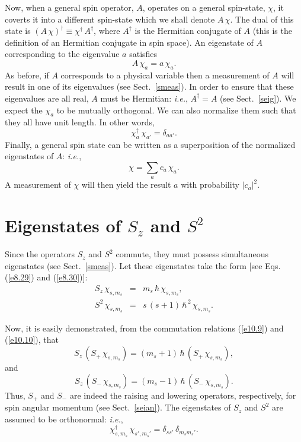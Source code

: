 Now, when a general spin operator, $A$, operates on a general spin-state, $\chi$, it coverts it into a different spin-state which we shall denote
$A\,\chi$. The dual of this state is $(A\,\chi)^\dag\equiv \chi^\dag\,A^\dag$, where $A^\dag$ is the Hermitian conjugate of $A$ (this is the definition of an
Hermitian conjugate in spin space).  An eigenstate
of $A$ corresponding to the eigenvalue $a$ satisfies
\begin{equation}
A\,\chi_{a} = a\,\chi_{a}.
\end{equation}
As before, if $A$ corresponds to a physical variable then a measurement
of $A$ will result in one of its eigenvalues (see Sect.~\ref{smeas}). In order to ensure that
these eigenvalues are all real, $A$ must be Hermitian: {\em i.e.}, $A^\dag=A$ (see Sect.~\ref{seig}). We expect the $\chi_a$ to be mutually orthogonal. We
can also normalize them such that they all have unit length. In other words,
\begin{equation}
\chi_{a}^\dag\,\chi_{a'} = \delta_{aa'}.
\end{equation}
Finally, a general spin state can be written
as a superposition of the normalized eigenstates of $A$: {\em i.e.}, 
\begin{equation}
\chi = \sum_a c_a\, \chi_{a}.
\end{equation}
A measurement of $\chi$ will then yield the result $a$ with probability $|c_a|^2$. 

\section{Eigenstates of $S_z$ and $S^2$}
Since the operators $S_z$ and $S^2$ commute, they must possess simultaneous
eigenstates (see Sect.~\ref{smeas}). Let these eigenstates take the form [see Eqs. (\ref{e8.29}) and (\ref{e8.30})]:
\begin{eqnarray}
S_z\,\chi_{s,m_s}&=& m_s\,\hbar\,\chi_{s,m_s},\label{e10.16}\\[0.5ex]
S^2\,\chi_{s,m_s} &=& s\,(s+1)\,\hbar^{\,2}\,\chi_{s,m_s}.\label{e10.17}
\end{eqnarray}

Now, it is easily demonstrated, from the commutation relations (\ref{e10.9}) and
(\ref{e10.10}), that
\begin{equation}
S_z\,(S_+\,\chi_{s,m_s}) = (m_s+1)\,\hbar\,(S_+\,\chi_{s,m_s}),
\end{equation}
and
\begin{equation}
S_z\,(S_-\,\chi_{s,m_s}) = (m_s-1)\,\hbar\,(S_-\,\chi_{s,m_s}).
\end{equation}
Thus, $S_+$ and $S_-$ are indeed the raising and lowering operators,
respectively, for spin angular momentum (see Sect.~\ref{seian}).
The eigenstates of $S_z$ and $S^2$ are assumed to be orthonormal: {\em i.e.},
\begin{equation}\label{e10.20}
\chi^\dag_{s,m_s}\,\chi_{s',m_s'} =\delta_{ss'}\,\delta_{m_s m_s'}.
\end{equation}


